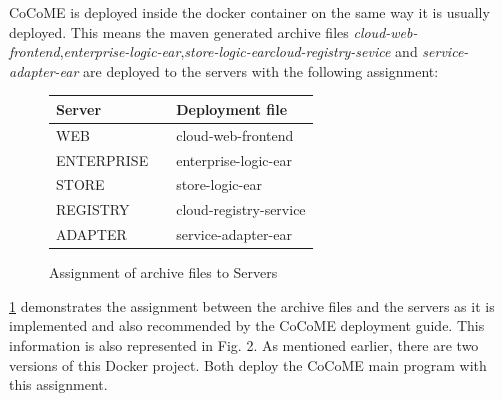  	CoCoME is deployed inside the docker container on the same way it is usually deployed. This means the maven generated archive files \textit{cloud-web-frontend},\textit{enterprise-logic-ear},\textit{store-logic-ear}\textit{cloud-registry-sevice} and \textit{service-adapter-ear} are deployed to the servers with the following assignment:
 	\begin{figure}[H]
 		\centering
 		\begin{tabular}{p{}|p{}p{}}
 			Server && Deployment file \\
 			\hline
 			WEB && cloud-web-frontend  \\
 			ENTERPRISE && enterprise-logic-ear  \\
 			STORE && store-logic-ear  \\
 			REGISTRY && cloud-registry-service  \\
 			ADAPTER && service-adapter-ear \\	
 		\end{tabular}
 		\caption{Assignment of archive files to Servers}
 		\label{table_assignment}
 	\end{figure}
 	\ref{table_assignment} demonstrates the assignment between the archive files and the servers as it is implemented and also recommended by the CoCoME deployment guide. This information is also represented in Fig. 2. As mentioned earlier, there are two versions of this Docker project. Both deploy the CoCoME main program with this assignment.\\ \\
 	
